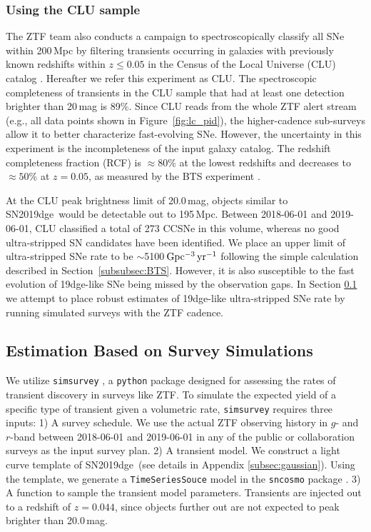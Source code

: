 \documentclass[twocolumn]{aastex63}
\newcommand{\name}{SN2019dge}
\begin{document}
\subsubsection{Using the CLU sample}
The ZTF team also conducts a campaign to spectroscopically 
classify all SNe within 200\,Mpc  by filtering transients occurring in galaxies with 
previously known redshifts within $z\leq0.05$ in the Census of the Local Universe (CLU) catalog 
\citep{De2020b}. Hereafter we refer this experiment as CLU. The spectroscopic completeness of 
transients in the CLU sample that had at least one detection brighter 
than 20\,mag is 89\%. Since CLU reads from the whole ZTF alert stream (e.g., all data points shown in 
Figure~\ref{fig:lc_pid}), the higher-cadence sub-surveys allow it to better characterize fast-evolving 
SNe. However, the uncertainty in this experiment is the incompleteness of the input galaxy catalog. 
The redshift completeness fraction (RCF) is $\approx80$\% at the lowest redshifts and decreases to 
$\approx50$\% at $z=0.05$, as measured by the BTS experiment \citep{FremlingBTS2019}.

At the CLU peak brightness limit of 20.0\,mag, objects similar to \name\ would be detectable out to 
195\,Mpc. Between 2018-06-01 and 2019-06-01, CLU classified a total of 273 CCSNe in this volume, 
whereas no good ultra-stripped SN candidates have been identified. We place an 
upper limit of ultra-stripped SNe rate to be $\sim$5100\,${\rm Gpc^{-3}\, yr^{-1}}$
following the simple calculation described in 
Section~\ref{subsubsec:BTS}. However, it is also susceptible to the fast 
evolution of 19dge-like SNe 
being missed by the observation gaps. In Section \ref{subsec:cadence} we attempt to place robust 
estimates of 19dge-like ultra-stripped SNe rate by running simulated surveys with the ZTF cadence.

\subsection{Estimation Based on Survey Simulations}\label{subsec:cadence}
We utilize \texttt{simsurvey} \citep{Feindt2019}, a \texttt{python} package designed for 
assessing the rates of transient discovery in surveys like ZTF. To simulate the expected yield of a 
specific type of transient given a volumetric rate, \texttt{simsurvey} requires three inputs: 1) A survey 
schedule. We use the actual ZTF observing history in $g$- and $r$-band between 2018-06-01 and 
2019-06-01 in any of the public or collaboration surveys as the input survey plan. 2) A transient model. 
We construct a light curve template of \name\ (see details in Appendix \ref{subsec:gaussian}). Using 
the template, we generate a \texttt{TimeSeriesSouce} model in the \texttt{sncosmo} package 
\citep{Barbary2016}. 3) A function to sample the transient model parameters. Transients are injected 
out to a redshift of $z=0.044$, since objects further out are not expected to peak brighter than 
20.0\,mag. 
\end{document}
